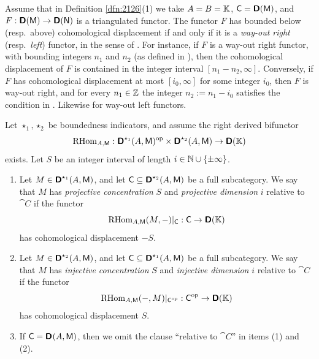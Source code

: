 \begin{rem} \label{rem:2126}
Assume that in Definition \ref{dfn:2126}(1) we take $A = B = \mathbb{K}$,  
$\operatorname{\mathsf{C}} = \boldsymbol{\mathsf{D}}(\operatorname{\mathsf{M}})$, and 
$F : \boldsymbol{\mathsf{D}}(\operatorname{\mathsf{M}}) \to \boldsymbol{\mathsf{D}}(\operatorname{\mathsf{N}})$
is a triangulated functor. The functor $F$ has bounded below (resp.\ above) 
cohomological displacement if and only if it is a {\em way-out right} (resp.\ 
{\em left}) functor, in the sense of \cite[Section I.7, Definition]{RD}.
For instance, if $F$ is a way-out right functor, with bounding integers 
$n_1$ and $n_2$ (as defined in \cite{RD}), then the cohomological displacement 
of $F$ is contained in the integer interval $[n_1 - n_2, \infty]$.
Conversely, if $F$ has cohomological displacement at most
$[i_0, \infty]$ for some integer $i_0$, then $F$ is way-out right, and for 
every $n_1 \in \mathbb{Z}$ the integer $n_2 :=  n_1 - i_0$ satisfies the condition in 
\cite{RD}. Likewise for way-out left functors.  
\end{rem}

\begin{dfn} \label{dfn:2128}
Let $\star_1, \star_2$ be boundedness indicators, and assume the right derived 
bifunctor 
\[ \operatorname{RHom}_{A, \operatorname{\mathsf{M}}} : 
\boldsymbol{\mathsf{D}}^{\star_1}(A, \operatorname{\mathsf{M}})^{\mathrm{op}} \times 
\boldsymbol{\mathsf{D}}^{\star_2}(A, \operatorname{\mathsf{M}}) \to \boldsymbol{\mathsf{D}}(\mathbb{K}) \]
exists. Let $S$ be an integer interval of length 
$i\in \mathbb{N} \cup \{\pm  \infty \}$.
\begin{enumerate}
\item Let $M \in \boldsymbol{\mathsf{D}}^{\star_1}(A, \operatorname{\mathsf{M}})$, and let 
$\operatorname{\mathsf{C}} \subseteq \boldsymbol{\mathsf{D}}^{\star_2}(A, \operatorname{\mathsf{M}})$ be a full 
subcategory. We say that $M$ has {\em projective concentration} $S$
and {\em projective dimension}%
%
$i$ relative to $\cat{C}$ if the functor
\[ \operatorname{RHom}_{A, \operatorname{\mathsf{M}}}(M, -)|_{\operatorname{\mathsf{C}}} : \operatorname{\mathsf{C}} \to \boldsymbol{\mathsf{D}}(\mathbb{K}) \]
has cohomological displacement $-S$.

\item Let $M \in \boldsymbol{\mathsf{D}}^{\star_2}(A, \operatorname{\mathsf{M}})$, and let 
$\operatorname{\mathsf{C}} \subseteq \boldsymbol{\mathsf{D}}^{\star_1}(A, \operatorname{\mathsf{M}})$ be a full  
subcategory. We say that $M$ has {\em injective concentration} $S$ 
and {\em injective dimension}%
%
$i$ relative to $\cat{C}$ if the functor
\[ \operatorname{RHom}_{A, \operatorname{\mathsf{M}}}(-, M)|_{\operatorname{\mathsf{C}}^{\mathrm{op}}} 
: \operatorname{\mathsf{C}}^{\mathrm{op}} \to \boldsymbol{\mathsf{D}}(\mathbb{K}) \]
has  cohomological displacement $S$.

\item If $\operatorname{\mathsf{C}} = \boldsymbol{\mathsf{D}}^{}(A, \operatorname{\mathsf{M}})$,
then we omit the clause ``relative to $\cat{C}$'' in items (1) and (2). 
\end{enumerate}
\end{dfn}

